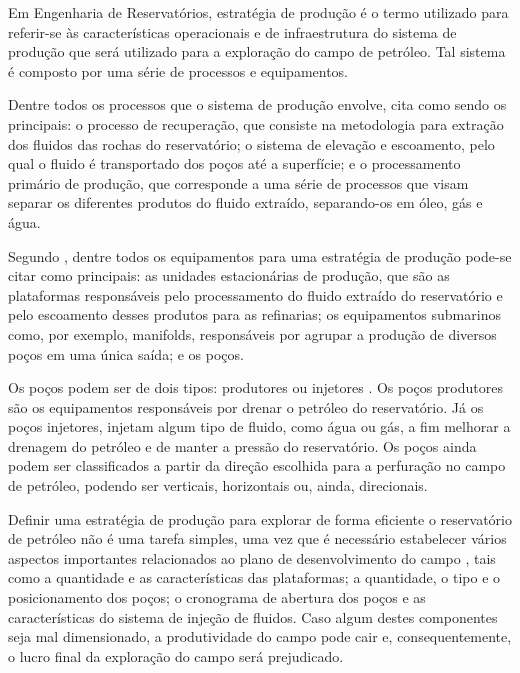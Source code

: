 Em Engenharia de Reservatórios, estratégia de produção é o termo utilizado para referir-se às características operacionais e de infraestrutura do sistema de produção que será utilizado para a exploração do campo de petróleo. Tal sistema é composto por uma série de processos e equipamentos. 

Dentre todos os processos que o sistema de produção envolve,  cita como sendo os principais: o processo de recuperação, que consiste na metodologia para extração dos fluidos das rochas do reservatório; o sistema de elevação e escoamento, pelo qual o fluido é transportado dos poços até a superfície; e o processamento primário de produção, que corresponde a uma série de processos que visam separar os diferentes produtos do fluido extraído, separando-os em óleo, gás e água. 

Segundo , dentre todos os equipamentos para uma estratégia de produção pode-se citar como principais: as unidades estacionárias de produção, que são as plataformas responsáveis pelo processamento do fluido extraído do reservatório e pelo escoamento desses produtos para as refinarias; os equipamentos submarinos como, por exemplo, manifolds, responsáveis por agrupar a produção de diversos poços em uma única saída;  e os poços.

Os poços podem ser de dois tipos: produtores ou injetores \cite{Petrobras2015}. Os poços produtores são os equipamentos responsáveis por drenar o petróleo do reservatório. Já os poços injetores, injetam algum tipo de fluido, como água ou gás, a fim melhorar a drenagem do petróleo e de manter a pressão do reservatório. Os poços ainda podem ser classificados a partir da direção escolhida para a perfuração no campo de petróleo, podendo ser verticais, horizontais ou, ainda, direcionais.

Definir uma estratégia de produção para explorar de forma eficiente o reservatório de petróleo não é uma tarefa simples, uma vez que é necessário estabelecer vários aspectos importantes relacionados ao plano de desenvolvimento do campo \cite{Nogueira2009}, tais como a quantidade e as características das plataformas; a quantidade, o tipo e o posicionamento dos poços; o cronograma de abertura dos poços e as características do sistema de injeção de fluidos. Caso algum destes componentes seja mal dimensionado, a produtividade do campo pode cair e, consequentemente, o lucro final da exploração do campo será prejudicado.

